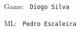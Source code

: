 
\begin{DoxyItemize}
\item Game\+: {\texttt{ Diogo Silva}}
\item ML\+: {\texttt{ Pedro Escaleira}} 
\end{DoxyItemize}